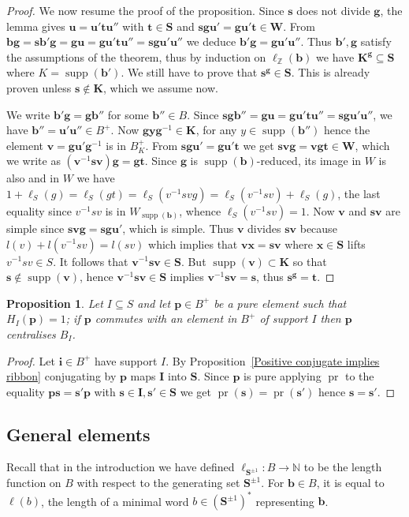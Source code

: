 \documentclass{amsart}
\numberwithin{equation}{section}
\newtheorem{proposition}[equation]{Proposition}
\newcommand\hl{{\ell}}
\newcommand\lS{{\ell_{\bS^{\pm1}}}}
\newcommand\lZ{{\ell_{\BZ}}}
\newcommand\inv{^{-1}}
\newcommand\bb{{\mathbf b}}
\newcommand\bg{{\mathbf g}}
\newcommand\bi{{\mathbf i}}
\newcommand\bp{{\mathbf p}}
\newcommand\bs{{\mathbf s}}
\newcommand\bt{{\mathbf t}}
\newcommand\bu{{\mathbf u}}
\newcommand\bv{{\mathbf v}}
\newcommand\bx{{\mathbf x}}
\newcommand\by{{\mathbf y}}
\newcommand\bI{{\mathbf I}}
\newcommand\bK{{\mathbf K}}
\newcommand\bS{{\mathbf S}}
\newcommand\bW{{\mathbf W}}
\newcommand\BN{{\mathbb N}}
\newcommand\BZ{{\mathbb Z}}
\DeclareMathOperator\pr{pr}
\DeclareMathOperator\supp{supp}
\begin{document}
\begin{proof}
We now resume the proof of the proposition.
Since $\bs$ does not divide $\bg$, the lemma gives $\bu=\bu'\bt \bu''$ with
$\bt\in \bS$ and $\bs \bg\bu'=\bg\bu'\bt\in\bW$. From $\bb\bg=\bs
\bb'\bg=\bg\bu=\bg\bu'\bt \bu''=\bs \bg\bu'\bu''$ we deduce
$\bb'\bg=\bg\bu'\bu''$.  Thus  $\bb',\bg$  satisfy  the  assumptions of the
 theorem, thus by induction on $\lZ(\bb)$ we have
 $\bK^\bg\subseteq \bS$ where $K=\supp(\bb')$. We still have to prove that $\bs^\bg\in \bS$.
This is already proven unless $\bs\not\in\bK$, which we assume now.

We  write $\bb'\bg=\bg\bb''$ for
some  $\bb''\in B$.  Since $\bs  \bg\bb''=\bg\bu=\bg\bu'\bt \bu''=\bs \bg
\bu'  \bu''$, we have $\bb''=\bu'\bu''\in B^+$. Now $\bg\by\bg\inv\in
\bK$, for any $y\in\supp(\bb'')$ hence the element $\bv=\bg\bu'\bg\inv$ is in  $B^+_K$. From $\bs
\bg\bu'=\bg\bu'\bt  $  we  get  $\bs  \bv  \bg=\bv\bg\bt\in\bW$, which we write as
$(\bv\inv  \bs  \bv)\bg=\bg\bt$.  Since  $\bg$  is $\supp(\bb)$-reduced, its
image  in $W$ is also and in $W$ we have $1+\ell_S(g)=\ell_S(gt)=\ell_S(v\inv s vg)=\ell_S(v\inv s
 v)+\ell_S(g)$, the last equality since $v\inv sv$ is in $W_{\supp(\bb)}$, 
whence  $\ell_S(v\inv s  v)=1$. Now  $\bv$ and  $\bs\bv$ are simple since 
$\bs\bv\bg=\bs\bg\bu'$, which is simple. Thus $\bv$ divides $\bs\bv$ because $l(v)+l(v\inv sv)=l(sv)$ which implies that 
$\bv\bx=\bs\bv$ where $\bx\in\bS$ lifts $v\inv sv\in S$. 
It follows that  $\bv\inv\bs\bv\in\bS$.  But  $\supp(\bv)\subset\bK$  so  that
$\bs\notin\supp   (\bv)$,  hence  $\bv\inv   \bs  \bv\in\bS$  implies
$\bv\inv \bs \bv=\bs$, thus $\bs^\bg=\bt$.
\end{proof}
\begin{proposition}\label{pure centralizer}Let $I\subseteq S$ and let
 $\bp\in B^+$ be a pure element such that $H_I(\bp)=1$; if $\bp$
commutes with an element in $B^+$ of support $I$
then $\bp$ centralises $B_I$.
\end{proposition}
\begin{proof}
Let $\bi\in B^+$ have support $I$.
By Proposition~\ref{Positive conjugate implies ribbon} conjugating by $\bp$ maps
$\bI$ into $\bS$. Since
$\bp$ is pure applying $\pr$ to the equality $\bp\bs=\bs'\bp$ with $\bs\in\bI,
\bs'\in\bS$ we get $\pr(\bs)=\pr(\bs')$ hence $\bs=\bs'$.
\end{proof}
\subsection*{General elements}
Recall that in the introduction we have defined $\lS:B\to\BN$ to be the length
function  on  $B$ with respect to
the generating set $\bS^{\pm 1}$. For $\bb\in B$, it is equal to
$\hl(b)$, the length of a minimal word $b\in(\bS^{\pm1})^*$ representing $\bb$.
\end{document}

